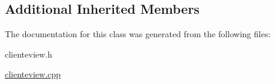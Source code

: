\subsection*{Additional Inherited Members}


The documentation for this class was generated from the following files\+:\begin{DoxyCompactItemize}
\item 
clienteview.\+h\item 
\mbox{\hyperlink{clienteview_8cpp}{clienteview.\+cpp}}\end{DoxyCompactItemize}
